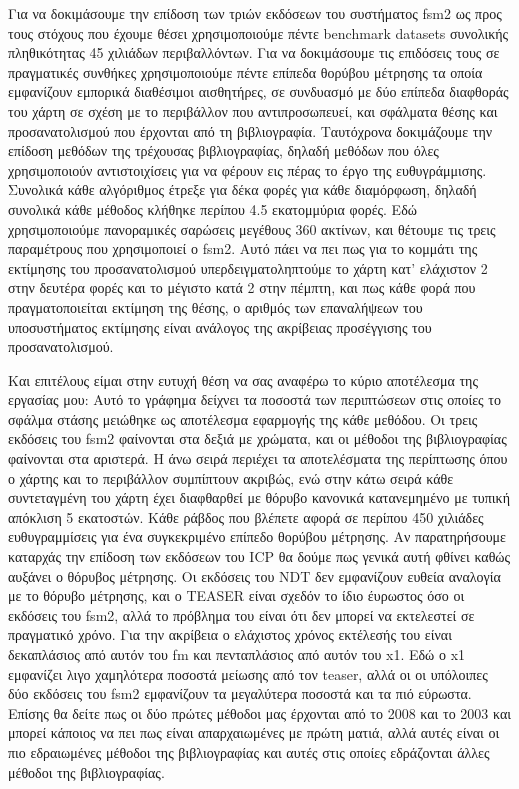 \documentclass[a4paper,10pt]{article}
\begin{document}
Για να δοκιμάσουμε την επίδοση των τριών εκδόσεων του συστήματος fsm2 ως προς
τους στόχους που έχουμε θέσει χρησιμοποιούμε πέντε benchmark datasets συνολικής
πληθικότητας 45 χιλιάδων περιβαλλόντων. Για να δοκιμάσουμε τις επιδόσεις τους
σε πραγματικές συνθήκες χρησιμοποιούμε πέντε επίπεδα θορύβου μέτρησης τα οποία
εμφανίζουν εμπορικά διαθέσιμοι αισθητήρες, σε συνδυασμό με δύο επίπεδα
διαφθοράς του χάρτη σε σχέση με το περιβάλλον που αντιπροσωπευεί, και σφάλματα
θέσης και προσανατολισμού που έρχονται από τη βιβλιογραφία. Ταυτόχρονα
δοκιμάζουμε την επίδοση μεθόδων της τρέχουσας βιβλιογραφίας, δηλαδή μεθόδων που
όλες χρησιμοποιούν αντιστοιχίσεις για να φέρουν εις πέρας το έργο της
ευθυγράμμισης. Συνολικά κάθε αλγόριθμος έτρεξε για δέκα φορές για κάθε
διαμόρφωση, δηλαδή συνολικά κάθε μέθοδος κλήθηκε περίπου 4.5 εκατομμύρια φορές.
Εδώ χρησιμοποιούμε πανοραμικές σαρώσεις μεγέθους 360 ακτίνων, και θέτουμε τις
τρεις παραμέτρους που χρησιμοποιεί ο fsm2. Αυτό πάει να πει πως για το κομμάτι
της εκτίμησης του προσανατολισμού υπερδειγματοληπτούμε το χάρτη κατ' ελάχιστον
2 στην δευτέρα φορές και το μέγιστο κατά 2 στην πέμπτη, και πως κάθε φορά
που πραγματοποιείται εκτίμηση της θέσης, ο αριθμός των επαναλήψεων του
υποσυστήματος εκτίμησης είναι ανάλογος της ακρίβειας προσέγγισης του
προσανατολισμού.

Και επιτέλους είμαι στην ευτυχή θέση να σας αναφέρω το κύριο αποτέλεσμα της
εργασίας μου: Αυτό το γράφημα δείχνει τα ποσοστά των περιπτώσεων στις οποίες το
σφάλμα στάσης μειώθηκε ως αποτέλεσμα εφαρμογής της κάθε μεθόδου.  Οι τρεις
εκδόσεις του fsm2 φαίνονται στα δεξιά με χρώματα, και οι μέθοδοι της
βιβλιογραφίας φαίνονται στα αριστερά. Η άνω σειρά περιέχει τα αποτελέσματα της
περίπτωσης όπου ο χάρτης και το περιβάλλον συμπίπτουν ακριβώς, ενώ στην κάτω
σειρά κάθε συντεταγμένη του χάρτη έχει διαφθαρθεί με θόρυβο κανονικά
κατανεμημένο με τυπική απόκλιση 5 εκατοστών. Κάθε ράβδος που βλέπετε αφορά σε
περίπου 450 χιλιάδες ευθυγραμμίσεις για ένα συγκεκριμένο επίπεδο θορύβου
μέτρησης. Αν παρατηρήσουμε καταρχάς την επίδοση των εκδόσεων του ICP θα δούμε
πως γενικά αυτή φθίνει καθώς αυξάνει ο θόρυβος μέτρησης. Οι εκδόσεις του NDT
δεν εμφανίζουν ευθεία αναλογία με το θόρυβο μέτρησης, και ο TEASER είναι σχεδόν
το ίδιο έυρωστος όσο οι εκδόσεις του fsm2, αλλά το πρόβλημα του είναι ότι δεν
μπορεί να εκτελεστεί σε πραγματικό χρόνο. Για την ακρίβεια ο ελάχιστος χρόνος
εκτέλεσής του είναι δεκαπλάσιος από αυτόν του fm και πενταπλάσιος από αυτόν του
x1. Εδώ ο x1 εμφανίζει λιγο χαμηλότερα ποσοστά μείωσης από τον teaser, αλλά οι
οι υπόλοιπες δύο εκδόσεις του fsm2 εμφανίζουν τα μεγαλύτερα ποσοστά και τα πιό
εύρωστα. Επίσης θα δείτε πως οι δύο πρώτες μέθοδοι μας έρχονται από το 2008 και
το 2003 και μπορεί κάποιος να πει πως είναι απαρχαιωμένες με πρώτη ματιά, αλλά
αυτές είναι οι πιο εδραιωμένες μέθοδοι της βιβλιογραφίας και αυτές στις οποίες
εδράζονται άλλες μέθοδοι της βιβλιογραφίας.
\end{document}
